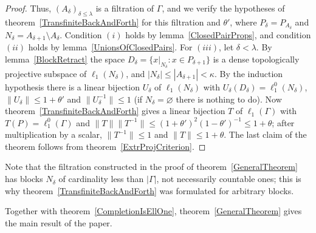 \documentclass[12pt]{article}
\newcommand{\lo}[1]{\ell_1^0(#1)}
\newcommand{\ellone}[1]{\ell_1(#1)}
\newcommand{\norm}[1]{\lVert #1\rVert}
\begin{document}
\begin{proof}
    Thus, ${(A_\delta)}_{\delta\leq\lambda}$ is a filtration of $\Gamma$, and
    we verify the hypotheses of theorem~\ref{TransfiniteBackAndForth} for
    this filtration and $\theta'$, where $P_\delta=P_{A_\delta}$ and
    $N_\delta=A_{\delta+1}\setminus A_\delta$. Condition $(i)$ holds by
    lemma~\ref{ClosedPairProps}, and condition $(ii)$ holds by
    lemma~\ref{UnionsOfClosedPairs}. For $(iii)$, let $\delta<\lambda$. By
    lemma~\ref{BlockRetract} the space $D_\delta=\{x|_{N_\delta}:x\in P_{\delta+1}\}$
    is a dense topologically projective subspace of $\ellone{N_\delta}$, and
    $|N_\delta|\leq|A_{\delta+1}|<\kappa$. By the induction hypothesis there
    is a linear bijection $U_\delta$ of $\ellone{N_\delta}$ with
    $U_\delta(D_\delta)=\lo{N_\delta}$, $\norm{U_\delta}\leq 1+\theta'$ and
    $\norm{U_\delta^{-1}}\leq 1$ (if $N_\delta=\varnothing$ there is nothing to
    do). Now theorem~\ref{TransfiniteBackAndForth} gives a linear bijection
    $T$ of $\ellone{\Gamma}$ with $T(P)=\lo{\Gamma}$ and
    $\norm{T}\norm{T^{-1}}\leq{(1+\theta')}^2{(1-\theta')}^{-1}\leq 1+\theta$;
    after multiplication by a scalar, $\norm{T^{-1}}\leq 1$ and
    $\norm{T}\leq 1+\theta$. The last claim of the theorem follows from
    theorem~\ref{ExtrProjCriterion}.
\end{proof}

Note that the filtration constructed in the proof of
theorem~\ref{GeneralTheorem} has blocks $N_\delta$ of cardinality less than
$|\Gamma|$, not necessarily countable ones; this is why
theorem~\ref{TransfiniteBackAndForth} was formulated for arbitrary blocks.

Together with theorem~\ref{CompletionIsEllOne}, theorem~\ref{GeneralTheorem}
gives the main result of the paper.
\end{document}
